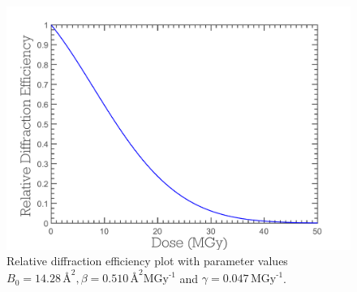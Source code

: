 \begin{figure}
  \centering
    \includegraphics[width=1\textwidth]{figures/zde/RDEPlot_zde.pdf}
    \caption[Relative diffraction efficiency as a function of the dose.]{Relative diffraction efficiency plot with parameter values $B_0 = 14.28\,\text{\AA}^2, \beta = 0.510\,\text{\AA}^2 \text{MGy}^{\text{-1}}$ and $\gamma = 0.047\,\text{MGy}^{\text{-1}}$.}
    \label{fig:Relative diffraction efficiency plot - ZDE}
\end{figure}

